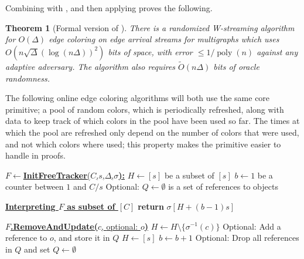 \documentclass[10pt]{article}
\newtheorem{theorem}{Theorem}[section]
\theoremstyle{definition}\newtheorem{definition}[lemma]{Definition}
\theoremstyle{remark}  \newtheorem*{remark}{Remark}
\newcommand{\tO}{\widetilde{O}}
\DeclareMathOperator{\poly}{poly}
\begin{document}

Combining  with , and then applying  proves the following.

\begin{theorem}[Formal version of ]\label{thm:Wstream-rand-ea-formal}
  There is a randomized W-streaming algorithm for $O(\Delta)$ edge coloring on edge arrival streams for multigraphs which uses $O(n \sqrt{\Delta} (\log (n \Delta))^2)$ bits of space, with error $\le 1/\poly(n)$ against any adaptive adversary. The algorithm also requires $\tO(n\Delta)$ bits of oracle randomness.
\end{theorem}


The following online edge coloring algorithms will both use the same core primitive; a pool of
random colors, which is periodically refreshed, along with data to keep track of which colors
in the pool have been used so far. The times at which the pool are refreshed only
depend on the number of colors that were used, and not which colors where used; this property makes
the primitive easier to handle in proofs.

\begin{algorithm}[htb!]
  \caption{Storing free regions from a permutation\label{alg:ds-rand-blocks}}
  \begin{algorithmic}[1]
    \Statex \underline{$F \gets $\textbf{InitFreeTracker}($C$,$s$,$\Delta$,$\sigma$\textbf{):}} 
    \State $H \gets [s]$ be a subset of $[s]$
    \State $b \gets 1$ be a counter between $1$ and $C/s$
    \State \textcolor{PineGreen}{Optional: $Q \gets \emptyset$ is a set of references to objects}

    \Statex
    
    \Statex \underline{\textbf{Interpreting $F$ as subset of $[C]$}}
    \State \textbf{return} $\sigma[H + (b -1) s]$
    \Statex
    
    \Statex \underline{$F$\textbf{.RemoveAndUpdate(}$c$, \textcolor{PineGreen}{optional: $o$}\textbf{)}} 
    \State $H \gets H \setminus \{ \sigma^{-1}(c)  \}$
    \State \textcolor{PineGreen}{Optional: Add a reference to $o$, and store it in $Q$}
     
      \State $H \gets [s]$
      \State $b \gets b + 1$
      \State \textcolor{PineGreen}{Optional: Drop all references in $Q$ and set $Q \gets \emptyset$}
    \EndIf
  \end{algorithmic}
\end{algorithm}
\end{document}
